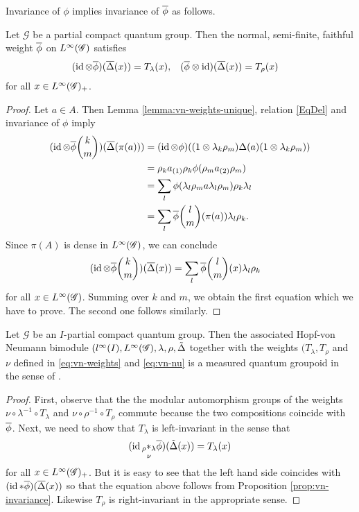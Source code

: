 Invariance of $\phi$ implies invariance of $\overline{\phi}$ as follows.
\begin{Prop} \label{prop:vn-invariance}
  Let $\mathscr{G}$ be a partial compact quantum group. Then the
  normal, semi-finite, faithful weight $\overline{\phi}$ on $L^{\infty}(\mathscr{G})$ satisfies
  \begin{align*}
    (\operatorname{id} \otimes \overline{\phi})(\overline{\Delta}(x)) &=  T_{\lambda}(x), &
    (\overline{\phi} \otimes \operatorname{id})(\overline{\Delta}(x)) &= T_{\rho}(x)
  \end{align*}
for all $x\in L^{\infty}(\mathscr{G})_{+}$.
\end{Prop}
\begin{proof}
  Let  $a \in A$.  Then Lemma \ref{lemma:vn-weights-unique}, relation \eqref{EqDel}
  and invariance of $\phi$ imply
  \begin{align*}
    (\operatorname{id} \otimes \overline{\phi}{k\choose m})(\overline{\Delta}(\pi(a))) &= (\operatorname{id} \otimes
    \phi)((1 \otimes \lambda_{k}\rho_{m})\Delta(a)(1 \otimes
    \lambda_{k}\rho_{m})) \\ & =
    \rho_{k}a_{(1)}\rho_{k}\phi(\rho_{m}a_{(2)}\rho_{m}) \\ & = \sum_{l}
    \phi(\lambda_{l}\rho_{m}a\lambda_{l}\rho_{m})\rho_{k}\lambda_{l} \\
    & = \sum_{l} \overline{\phi}{l\choose m}(\pi(a)) \lambda_{l}\rho_{k}.
  \end{align*}
  Since $\pi(A)$ is dense in $L^{\infty}(\mathscr{G})$, we can conclude
  \begin{align*}
    (\operatorname{id} \otimes \overline{\phi}{k\choose m}) (\overline{\Delta} (x)) &= \sum_{l} \overline{\phi}{l\choose m}(x) \lambda_{l}\rho_{k}
  \end{align*}
  for all $x \in L^{\infty}(\mathscr{G})$. Summing over $k$ and $m$, we obtain the
  first  equation which we have to prove. The second one follows similarly.
\end{proof}
\begin{Theorem}
Let $\mathscr{G}$ be an $I$-partial compact quantum group. Then the
associated Hopf-von Neumann bimodule
$(l^{\infty}(I),L^{\infty}(\mathscr{G}),\lambda,\rho,\tilde\Delta$ together with the weights
    $(T_{\lambda},T_{\rho}$ and $\nu$ defined in
    \eqref{eq:vn-weights} and \eqref{eq:vn-nu}
  is a measured quantum groupoid in the sense of \cite{enock:action}.
\end{Theorem}
\begin{proof}
  First, observe that the  the modular
  automorphism groups of the weights $\nu \circ \lambda^{-1} \circ
  T_{\lambda}$ and $\nu \circ \rho^{-1} \circ T_{\rho}$ commute  because the two
  compositions coincide with $\overline{\phi}$. Next, we need  to show that
  $T_{\lambda}$ is left-invariant in the sense that
  \begin{align*}
   (\operatorname{id} \underset{\nu}{_{\rho}\ast_{\lambda}} \overline{\phi})(\tilde\Delta(x)) = T_{\lambda}(x) 
  \end{align*}
for all $x\in L^{\infty}(\mathscr{G})_{+}$. But it is easy to see that the left hand
side coincides with   $(\operatorname{id} \ast \overline{\phi})(\overline{\Delta}(x))$ so that the
equation above follows from Proposition
\ref{prop:vn-invariance}. Likewise $T_{\rho}$ is right-invariant in
the appropriate sense.
\end{proof}



